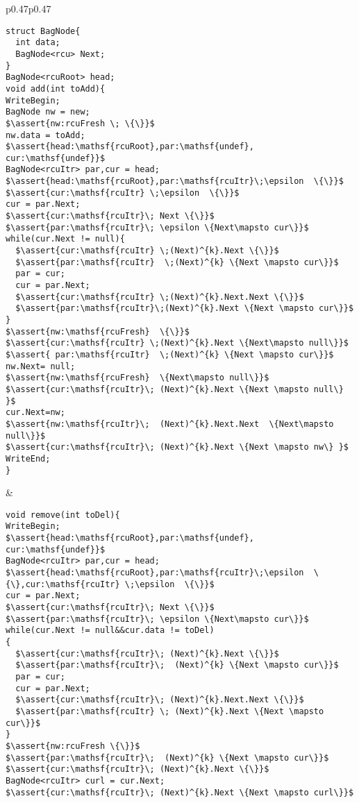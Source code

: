 \begin{figure*}[t!]
\begin{tabular}{p{}p{}}
\begin{lstlisting}[basicstyle=\scriptsize\ttfamily]
struct BagNode{
  int data;
  BagNode<rcu> Next;
}
BagNode<rcuRoot> head;
void add(int toAdd){
WriteBegin;
BagNode nw = new;
$\assert{nw:rcuFresh \; \{\}}$
nw.data = toAdd;
$\assert{head:\mathsf{rcuRoot},par:\mathsf{undef}, cur:\mathsf{undef}}$
BagNode<rcuItr> par,cur = head;
$\assert{head:\mathsf{rcuRoot},par:\mathsf{rcuItr}\;\epsilon  \{\}}$
$\assert{cur:\mathsf{rcuItr} \;\epsilon  \{\}}$
cur = par.Next;
$\assert{cur:\mathsf{rcuItr}\; Next \{\}}$
$\assert{par:\mathsf{rcuItr}\; \epsilon \{Next\mapsto cur\}}$
while(cur.Next != null){
  $\assert{cur:\mathsf{rcuItr} \;(Next)^{k}.Next \{\}}$
  $\assert{par:\mathsf{rcuItr}  \;(Next)^{k} \{Next \mapsto cur\}}$
  par = cur;
  cur = par.Next;
  $\assert{cur:\mathsf{rcuItr} \;(Next)^{k}.Next.Next \{\}}$
  $\assert{par:\mathsf{rcuItr}\;(Next)^{k}.Next \{Next \mapsto cur\}}$
}
$\assert{nw:\mathsf{rcuFresh}  \{\}}$
$\assert{cur:\mathsf{rcuItr} \;(Next)^{k}.Next \{Next\mapsto null\}}$
$\assert{ par:\mathsf{rcuItr}  \;(Next)^{k} \{Next \mapsto cur\}}$
nw.Next= null;
$\assert{nw:\mathsf{rcuFresh}  \{Next\mapsto null\}}$
$\assert{cur:\mathsf{rcuItr}\; (Next)^{k}.Next \{Next \mapsto null\} }$
cur.Next=nw;
$\assert{nw:\mathsf{rcuItr}\;  (Next)^{k}.Next.Next  \{Next\mapsto null\}}$
$\assert{cur:\mathsf{rcuItr}\; (Next)^{k}.Next \{Next \mapsto nw\} }$
WriteEnd;
}
\end{lstlisting}&
\begin{lstlisting}[basicstyle=\scriptsize\ttfamily]
void remove(int toDel){
WriteBegin;
$\assert{head:\mathsf{rcuRoot},par:\mathsf{undef}, cur:\mathsf{undef}}$
BagNode<rcuItr> par,cur = head;
$\assert{head:\mathsf{rcuRoot},par:\mathsf{rcuItr}\;\epsilon  \{\},cur:\mathsf{rcuItr} \;\epsilon  \{\}}$
cur = par.Next;
$\assert{cur:\mathsf{rcuItr}\; Next \{\}}$
$\assert{par:\mathsf{rcuItr}\; \epsilon \{Next\mapsto cur\}}$
while(cur.Next != null&&cur.data != toDel)
{
  $\assert{cur:\mathsf{rcuItr}\; (Next)^{k}.Next \{\}}$
  $\assert{par:\mathsf{rcuItr}\;  (Next)^{k} \{Next \mapsto cur\}}$
  par = cur;
  cur = par.Next;
  $\assert{cur:\mathsf{rcuItr}\; (Next)^{k}.Next.Next \{\}}$
  $\assert{par:\mathsf{rcuItr} \; (Next)^{k}.Next \{Next \mapsto cur\}}$
}
$\assert{nw:rcuFresh \{\}}$
$\assert{par:\mathsf{rcuItr}\;  (Next)^{k} \{Next \mapsto cur\}}$
$\assert{cur:\mathsf{rcuItr}\; (Next)^{k}.Next \{\}}$
BagNode<rcuItr> curl = cur.Next;
$\assert{cur:\mathsf{rcuItr}\; (Next)^{k}.Next \{Next \mapsto curl\}}$

\end{lstlisting}
\end{tabular}
\end{figure*}
